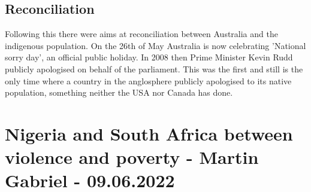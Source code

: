 \documentclass{article}
\begin{document}
	\subsection{Reconciliation}
	Following this there were aims at reconciliation between Australia and the indigenous population. On the 26th of May Australia is now celebrating 'National sorry day', an official public holiday. In 2008 then Prime Minister Kevin Rudd publicly apologised on behalf of the parliament. This was the first and still is the only time where a country in the anglosphere publicly apologised to its native population, something neither the USA nor Canada has done.

	\section{Nigeria and South Africa between violence and poverty - Martin Gabriel - 09.06.2022}
\end{document}
